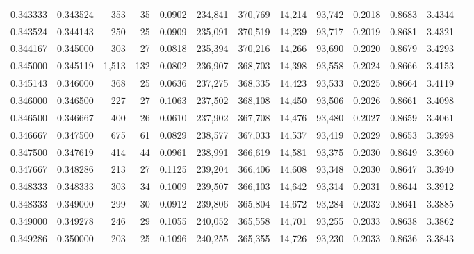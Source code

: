 \begin{tabular}{rrrrrrrrrrrrr}
0.343333 & 0.343524 &   353 &  35 &                                     0.0902 & 234,841 & 370,769 &  14,214 &  93,742 & 0.2018 & 0.8683 & 3.4344 \\
0.343524 & 0.344143 &   250 &  25 &                                     0.0909 & 235,091 & 370,519 &  14,239 &  93,717 & 0.2019 & 0.8681 & 3.4321 \\
0.344167 & 0.345000 &   303 &  27 &                                     0.0818 & 235,394 & 370,216 &  14,266 &  93,690 & 0.2020 & 0.8679 & 3.4293 \\
0.345000 & 0.345119 & 1,513 & 132 &                                     0.0802 & 236,907 & 368,703 &  14,398 &  93,558 & 0.2024 & 0.8666 & 3.4153 \\
0.345143 & 0.346000 &   368 &  25 &                                     0.0636 & 237,275 & 368,335 &  14,423 &  93,533 & 0.2025 & 0.8664 & 3.4119 \\
0.346000 & 0.346500 &   227 &  27 &                                     0.1063 & 237,502 & 368,108 &  14,450 &  93,506 & 0.2026 & 0.8661 & 3.4098 \\
0.346500 & 0.346667 &   400 &  26 &                                     0.0610 & 237,902 & 367,708 &  14,476 &  93,480 & 0.2027 & 0.8659 & 3.4061 \\
0.346667 & 0.347500 &   675 &  61 &                                     0.0829 & 238,577 & 367,033 &  14,537 &  93,419 & 0.2029 & 0.8653 & 3.3998 \\
0.347500 & 0.347619 &   414 &  44 &                                     0.0961 & 238,991 & 366,619 &  14,581 &  93,375 & 0.2030 & 0.8649 & 3.3960 \\
0.347667 & 0.348286 &   213 &  27 &                                     0.1125 & 239,204 & 366,406 &  14,608 &  93,348 & 0.2030 & 0.8647 & 3.3940 \\
0.348333 & 0.348333 &   303 &  34 &                                     0.1009 & 239,507 & 366,103 &  14,642 &  93,314 & 0.2031 & 0.8644 & 3.3912 \\
0.348333 & 0.349000 &   299 &  30 &                                     0.0912 & 239,806 & 365,804 &  14,672 &  93,284 & 0.2032 & 0.8641 & 3.3885 \\
0.349000 & 0.349278 &   246 &  29 &                                     0.1055 & 240,052 & 365,558 &  14,701 &  93,255 & 0.2033 & 0.8638 & 3.3862 \\
0.349286 & 0.350000 &   203 &  25 &                                     0.1096 & 240,255 & 365,355 &  14,726 &  93,230 & 0.2033 & 0.8636 & 3.3843 \\

\end{tabular}
